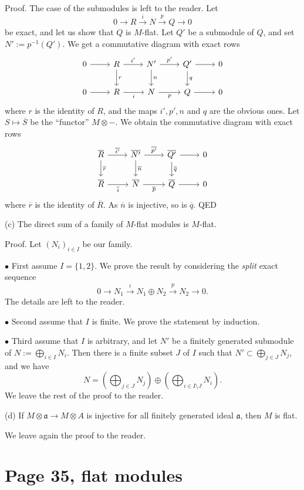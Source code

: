 \documentclass[12pt]{article}
\newcommand{\mf}{\mathfrak}
\newcommand{\aaa}{\mf a}
\newcommand{\bu}{\bullet}
\begin{document}
Proof. The case of the submodules is left to the reader. Let 
$$
0\to R\xrightarrow iN\xrightarrow pQ\to0
$$ 
be exact, and let us show that $Q$ is $M$-flat. Let $Q'$ be a submodule of $Q$, and set $N':=p^{-1}(Q')$. We get a commutative diagram with exact rows
$$
\begin{tikzcd}
0\ar[r]&R\ar[d,"r"]\ar[r,"i'"]&N'\ar[d,"n"]\ar[r,"p'"]& Q'\ar[d,"q"]\ar[r]&0\\ 
0\ar[r]&R\ar[r,"i"']&N\ar[r,"p"']& Q\ar[r]&0
\end{tikzcd}
$$ 
where $r$ is the identity of $R$, and the maps $i',p',n$ and $q$ are the obvious ones. Let $S\mapsto\overline S$ be the ``functor'' $M\otimes-$. We obtain the commutative diagram with exact rows
$$
\begin{tikzcd}
\overline R\ar[d,"\overline r"]\ar[r,"\overline{i'}"]&\overline{N'}\ar[d,"\overline n"]\ar[r,"\overline{p'}"]& \overline{Q'}\ar[d,"\overline q"]\ar[r]&0\\ 
\overline R\ar[r,"\overline i"']&\overline N\ar[r,"\overline p"']& \overline Q\ar[r]&0
\end{tikzcd}
$$ 
where $\overline r$ is the identity of $\overline R$. As $\overline n$ is injective, so is $\overline q$. QED

(c) The direct sum of a family of $M$-flat modules is $M$-flat. 

Proof. Let $(N_i)_{i\in I}$ be our family. 

$\bu$ First assume $I=\{1,2\}$. We prove the result by considering the \emph{split} exact sequence 
$$
0\to N_1\xrightarrow i N_1\oplus N_2\xrightarrow pN_2\to0.
$$ 
The details are left to the reader.

$\bu$ Second assume that $I$ is finite. We prove the statement by induction.

$\bu$ Third assume that $I$ is arbitrary, and let $N'$ be a finitely generated submodule of $N:=\bigoplus_{i\in I}N_i$. Then there is a finite subset $J$ of $I$ such that $N'\subset\bigoplus_{j\in J}N_j$, and we have 
$$
N=\left(\bigoplus_{j\in J}N_j\right)\oplus\left(\bigoplus_{i\in I\setminus J}N_i\right). 
$$ 
We leave the rest of the proof to the reader.

(d) If $M\otimes\aaa\to M\otimes A$ is injective for all finitely generated ideal $\aaa$, then $M$ is flat.

We leave again the proof to the reader.

\section{Page 35, flat modules}%
\end{document}
